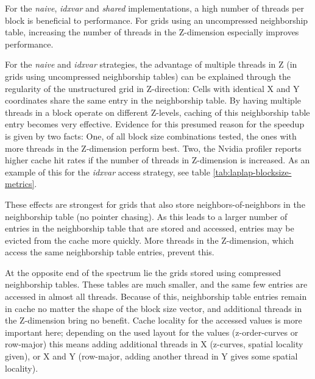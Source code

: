 For the \emph{naive}, \emph{idxvar} and \emph{shared} implementations, a high number of threads per block is beneficial to performance. For grids using an uncompressed neighborship table, increasing the number of threads in the Z-dimension especially improves performance.

For the \emph{naive} and \emph{idxvar} strategies, the advantage of multiple threads in Z (in grids using uncompressed neighborship tables) can be explained through the regularity of the unstructured grid in Z-direction: Cells with identical X and Y coordinates share the same entry in the neighborship table. By having multiple threads in a block operate on different Z-levels, caching of this neighborship table entry becomes very effective. Evidence for this presumed reason for the speedup is given by two facts: One, of all block size combinations tested, the ones with more threads in the Z-dimension perform best. Two, the Nvidia profiler reports higher cache hit rates if the number of threads in Z-dimension is increased. As an example of this for the \emph{idxvar} access strategy, see table \ref{tab:laplap-blocksize-metrics}.

These effects are strongest for grids that also store neighbors-of-neighbors in the neighborship table (no pointer chasing). As this leads to a larger number of entries in the neighborship table that are stored and accessed, entries may be evicted from the cache more quickly. More threads in the Z-dimension, which access the same neighborship table entries, prevent this.

At the opposite end of the spectrum lie the grids stored using compressed neighborship tables. These tables are much smaller, and the same few entries are accessed in almost all threads. Because of this, neighborship table entries remain in cache no matter the shape of the block size vector, and additional threads in the Z-dimension bring no benefit. Cache locality for the accessed values is more important here; depending on the used layout for the values (z-order-curves or row-major) this means adding additional threads in X (z-curves, spatial locality given), or X and Y (row-major, adding another thread in Y gives some spatial locality).

